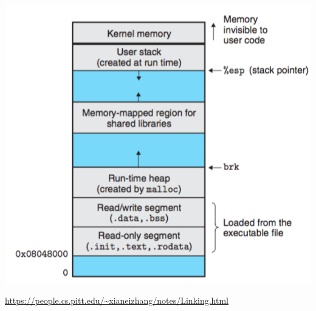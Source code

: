 \documentclass[usenames,dvipsnames]{beamer}
\begin{document}
\begin{frame}
\centering
\includegraphics[scale=0.35]{linux_mem.png}

\tiny{\url{https://people.cs.pitt.edu/~xianeizhang/notes/Linking.html}}
\end{frame}
\end{document}
